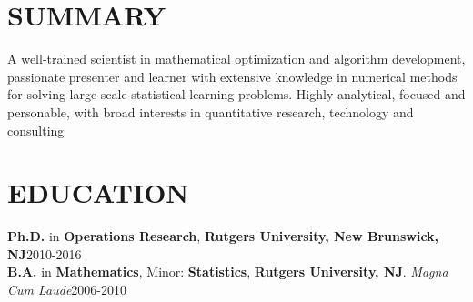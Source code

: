\documentclass[10.5pt]{res} %
\begin{document}
\address{%
\quad Phone: (732) 447-6825~~E-mail:~~yaowang74\footnotesize{\MVAt}\normalsize{gmail.com}
~~Work Authorization: U.S. Citizen}%


\begin{resume}


\section{SUMMARY}
A well-trained scientist in mathematical optimization and algorithm development, passionate presenter and learner with extensive knowledge in numerical methods for solving large scale statistical learning problems. Highly analytical, focused and personable, with broad interests in quantitative research, technology and consulting

\section{EDUCATION}
                \textbf{Ph.D.} in \textbf{Operations Research}, \textbf{Rutgers University, New Brunswick, NJ}\hfill 2010-2016\\
                \textbf{B.A.} in \textbf{Mathematics}, Minor: \textbf{Statistics}, \textbf{Rutgers University, NJ}. \emph{Magna Cum Laude}\hfill 2006-2010
%

\end{resume}
\end{document}
